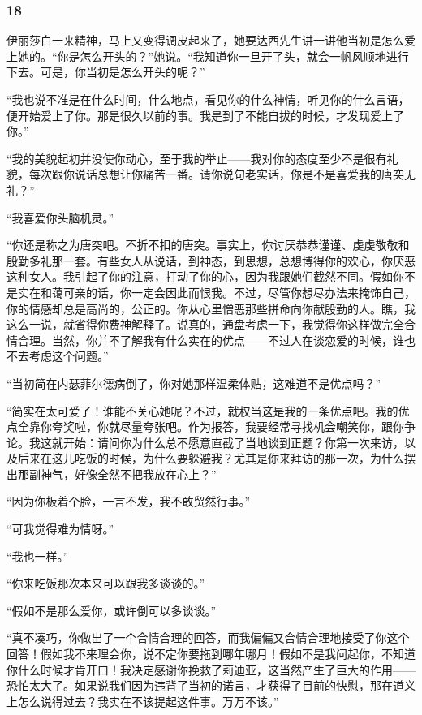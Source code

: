 \subsubsection*{18}

\par 伊丽莎白一来精神，马上又变得调皮起来了，她要达西先生讲一讲他当初是怎么爱上她的。“你是怎么开头的？”她说。“我知道你一旦开了头，就会一帆风顺地进行下去。可是，你当初是怎么开头的呢？”
\par “我也说不准是在什么时间，什么地点，看见你的什么神情，听见你的什么言语，便开始爱上了你。那是很久以前的事。我是到了不能自拔的时候，才发现爱上了你。”
\par “我的美貌起初并没使你动心，至于我的举止——我对你的态度至少不是很有礼貌，每次跟你说话总想让你痛苦一番。请你说句老实话，你是不是喜爱我的唐突无礼？”
\par “我喜爱你头脑机灵。”
\par “你还是称之为唐突吧。不折不扣的唐突。事实上，你讨厌恭恭谨谨、虔虔敬敬和殷勤多礼那一套。有些女人从说话，到神态，到思想，总想博得你的欢心，你厌恶这种女人。我引起了你的注意，打动了你的心，因为我跟她们截然不同。假如你不是实在和蔼可亲的话，你一定会因此而恨我。不过，尽管你想尽办法来掩饰自己，你的情感却总是高尚的，公正的。你从心里憎恶那些拼命向你献殷勤的人。瞧，我这么一说，就省得你费神解释了。说真的，通盘考虑一下，我觉得你这样做完全合情合理。当然，你并不了解我有什么实在的优点——不过人在谈恋爱的时候，谁也不去考虑这个问题。”
\par “当初简在内瑟菲尔德病倒了，你对她那样温柔体贴，这难道不是优点吗？”
\par “简实在太可爱了！谁能不关心她呢？不过，就权当这是我的一条优点吧。我的优点全靠你夸奖啦，你就尽量夸张吧。作为报答，我要经常寻找机会嘲笑你，跟你争论。我这就开始：请问你为什么总不愿意直截了当地谈到正题？你第一次来访，以及后来在这儿吃饭的时候，为什么要躲避我？尤其是你来拜访的那一次，为什么摆出那副神气，好像全然不把我放在心上？”
\par “因为你板着个脸，一言不发，我不敢贸然行事。”
\par “可我觉得难为情呀。”
\par “我也一样。”
\par “你来吃饭那次本来可以跟我多谈谈的。”
\par “假如不是那么爱你，或许倒可以多谈谈。”
\par “真不凑巧，你做出了一个合情合理的回答，而我偏偏又合情合理地接受了你这个回答！假如我不来理会你，说不定你要拖到哪年哪月！假如不是我问起你，不知道你什么时候才肯开口！我决定感谢你挽救了莉迪亚，这当然产生了巨大的作用——恐怕太大了。如果说我们因为违背了当初的诺言，才获得了目前的快慰，那在道义上怎么说得过去？我实在不该提起这件事。万万不该。”

